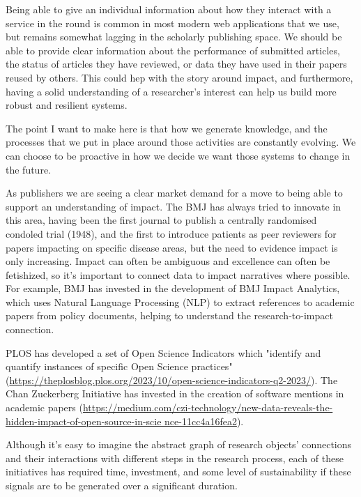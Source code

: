 \documentclass[]{hdsr}
\begin{document}
Being able to give an individual information about how they interact with a service in the round is common in most modern web applications that we use, but remains somewhat lagging in the scholarly publishing space. We should be able to provide clear information about the performance of submitted articles, the status of articles they have reviewed, or data they have used in their papers reused by others. This could hep with the story around impact, and furthermore, having a solid understanding of a researcher's interest can help us build more robust and resilient systems.

The point I want to make here is that how we generate knowledge, and the processes that we put in place around those activities are constantly evolving. We can choose to be proactive in how we decide we want those systems to change in the future.

As publishers we are seeing a clear market demand for a move to being able to support an understanding of impact. The BMJ has always tried to innovate in this area, having been the first journal to publish a centrally randomised condoled trial (1948), and the first to introduce patients as peer reviewers for papers impacting on specific disease areas, but the need to evidence impact is only increasing. Impact can often be ambiguous and excellence can often be fetishized, so it's important to connect data to impact narratives where possible. For example, BMJ has invested in the development of BMJ Impact Analytics, which uses Natural Language Processing (NLP) to extract references to academic papers from policy documents, helping to understand the research-to-impact connection.

PLOS has developed a set of Open Science Indicators which "identify and quantify instances of specific Open Science practices"(\href{https://theplosblog.plos.org/2023/10/open-science-indicators-q2-2023/}{https://theplosblog.plos.org/2023/10/open-science-indicators-q2-2023/}). The Chan Zuckerberg Initiative has invested in the creation of software mentions in academic papers (\href{https://medium.com/czi-technology/new-data-reveals-the-hidden-impact-of-open-source-in-scie nce-11cc4a16fea2}{https://medium.com/czi-technology/new-data-reveals-the-hidden-impact-of-open-source-in-scie nce-11cc4a16fea2}).

Although it's easy to imagine the abstract graph of research objects' connections and their interactions with different steps in the research process, each of these initiatives has required time, investment, and some level of sustainability if these signals are to be generated over a significant duration.
\end{document}

